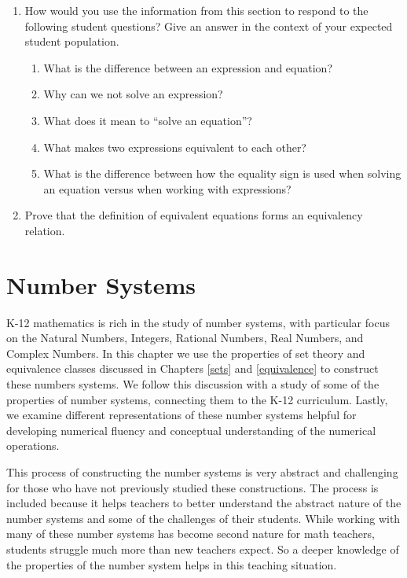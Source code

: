 \documentclass[
]{book}
\providecommand{\tightlist}{%
  \setlength{\itemsep}{0pt}\setlength{\parskip}{0pt}}
\theoremstyle{definition}
\theoremstyle{definition}
\theoremstyle{definition}
\theoremstyle{definition}
\theoremstyle{remark}
\begin{document}
\begin{enumerate}
\def\labelenumi{\arabic{enumi}.}
\tightlist
\item
  How would you use the information from this section to respond to the following student questions? Give an answer in the context of your expected student population.

  \begin{enumerate}
  \def\labelenumii{\alph{enumii}.}
  \tightlist
  \item
    What is the difference between an expression and equation?
  \item
    Why can we not solve an expression?
  \item
    What does it mean to ``solve an equation''?
  \item
    What makes two expressions equivalent to each other?
  \item
    What is the difference between how the equality sign is used when solving an equation versus when working with expressions?
  \end{enumerate}
\item
  Prove that the definition of equivalent equations forms an equivalency relation.
\end{enumerate}

\hypertarget{number}{%
\chapter{Number Systems}\label{number}}

K-12 mathematics is rich in the study of number systems, with particular focus on the Natural Numbers, Integers, Rational Numbers, Real Numbers, and Complex Numbers. In this chapter we use the properties of set theory and equivalence classes discussed in Chapters \ref{sets} and \ref{equivalence} to construct these numbers systems. We follow this discussion with a study of some of the properties of number systems, connecting them to the K-12 curriculum. Lastly, we examine different representations of these number systems helpful for developing numerical fluency and conceptual understanding of the numerical operations.

This process of constructing the number systems is very abstract and challenging for those who have not previously studied these constructions. The process is included because it helps teachers to better understand the abstract nature of the number systems and some of the challenges of their students. While working with many of these number systems has become second nature for math teachers, students struggle much more than new teachers expect. So a deeper knowledge of the properties of the number system helps in this teaching situation.
\end{document}
